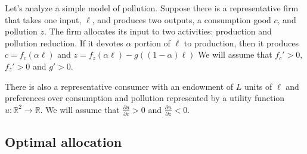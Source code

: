 \documentclass[12pt,reqno]{amsart}
\theoremstyle{definition}
\def\R{\mathbb{R}}
\renewcommand{\to}{{\rightarrow}}
\begin{document}
Let's analyze a simple model of pollution. Suppose there is a
representative firm that takes one input, $\ell$, and produces two
outputs, a consumption good $c$, and pollution $z$. The firm allocates
its input to two activities: production and pollution reduction. If it
devotes $\alpha$ portion of $\ell$ to production, then it produces
$c=f_c(\alpha \ell)$ and $z = f_z(\alpha \ell) - g((1-\alpha)\ell)$ We will assume that
$f_c'>0$, $f_z'>0$ and $g'>0$. 

There is also a representative consumer with an
endowment of $L$ units of $\ell$ and preferences over consumption and
pollution represented by a utility function $u:\R^2 \to \R$. We will
assume that $\frac{\partial u}{\partial c}>0$ and $\frac{\partial
  u}{\partial z} < 0$. 

\subsection{Optimal allocation}
\end{document}
